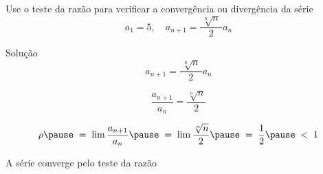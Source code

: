\begin{question}
  Use o teste da razão para verificar a convergência ou divergência da série
  \[
    a_1 = 5,
    \quad
    a_{n+1} = \frac{\,\sqrt[n]{n}\,}{2} a_n
  \]
\end{question}

\begin{resolution}{Solução}
  \[
    a_{n+1} = \frac{\,\sqrt[n]{n}\,}{2} a_n
  \]

  \pause
  \[
    \frac{a_{n+1}}{a_n}
    = \frac{\sqrt[n]{n}}{2}
  \]

  \pause
  \[
    \rho
    \pause
    \;=\; \lim \frac{a_{n+1}}{a_n}
    \pause
    \;=\; \lim \frac{\sqrt[n]{n}}{2}
    \pause
    \;=\; \frac{1}{2}
    \pause
    \;<\; 1
  \]

  \pause
  A série converge pelo teste da razão
\end{resolution}

